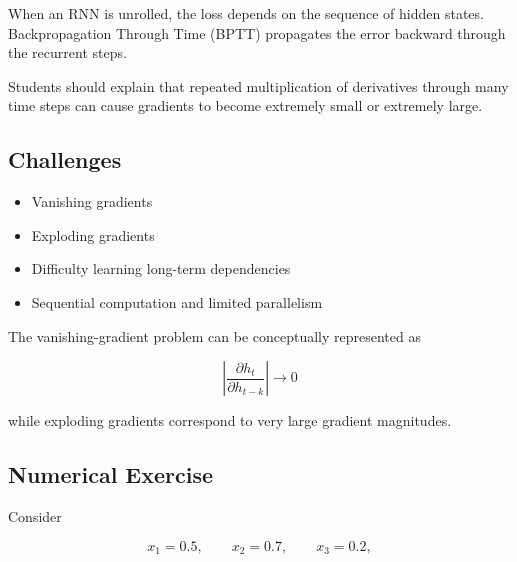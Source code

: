 \documentclass[10pt]{article}
\begin{document}
When an RNN is unrolled, the loss depends on the sequence of hidden states.
Backpropagation Through Time (BPTT) propagates the error backward through
the recurrent steps.

\begin{center}
\end{center}

Students should explain that repeated multiplication of derivatives through
many time steps can cause gradients to become extremely small or extremely
large.

\subsection*{Challenges}

\begin{itemize}
\item Vanishing gradients
\item Exploding gradients
\item Difficulty learning long-term dependencies
\item Sequential computation and limited parallelism
\end{itemize}

The vanishing-gradient problem can be conceptually represented as

\[
\left|\frac{\partial h_t}{\partial h_{t-k}}\right|\rightarrow0
\]

while exploding gradients correspond to very large gradient magnitudes.

\subsection*{Numerical Exercise}

Consider

\[
x_1=0.5,\qquad x_2=0.7,\qquad x_3=0.2,
\]
\end{document}
